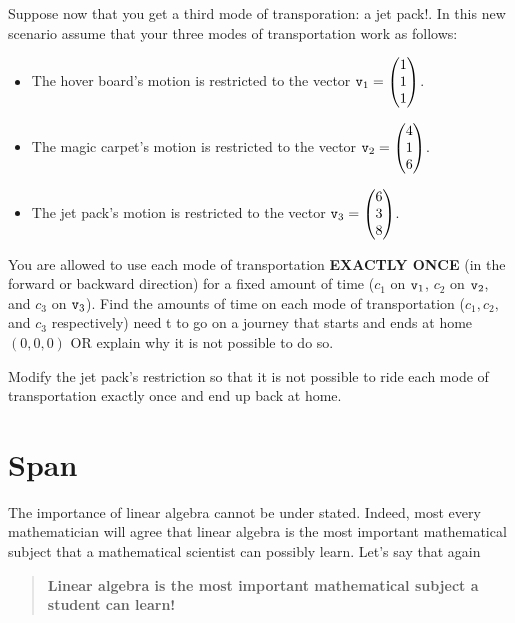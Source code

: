 \begin{problem}
    Suppose now that you get a third mode of transporation: a jet pack!.  In this new
    scenario assume that your three modes of transportation work as follows:
    \begin{itemize}
        \item The hover board's motion is restricted to the vector $\texttt{v}_1 =
            \begin{pmatrix} 1\\1\\1\end{pmatrix}$.
        \item The magic carpet's motion is restricted to the vector $\texttt{v}_2 =
            \begin{pmatrix} 4\\1\\6\end{pmatrix}$.
        \item The jet pack's motion is restricted to the vector $\texttt{v}_3 =
            \begin{pmatrix} 6\\3\\8\end{pmatrix}$.
    \end{itemize}
    You are allowed to use each mode of transportation {\bf EXACTLY ONCE} (in the forward or
    backward direction) for a fixed amount of time ($c_1$ on $\texttt{v}_1$, $c_2$ on $\texttt{v}_2$,
    and $c_3$ on $\texttt{v}_3$).  Find the amounts of time on each mode of transportation ($c_1,
    c_2,$ and $c_3$ respectively) need t to go on a journey that starts and ends at home
    $(0,0,0)$ OR explain why it is not possible to do so.
\end{problem}

\begin{problem}
    Modify the jet pack's restriction so that it is not possible to ride each mode of
    transportation exactly once and end up back at home.
\end{problem}



\newpage\section{Span}
The importance of linear algebra cannot be under stated.  Indeed, most every mathematician will
agree that linear algebra is the most important mathematical subject that a mathematical
scientist can possibly learn.  Let's say that again
\begin{quote}
    {\bf Linear algebra is the most important mathematical subject a student can learn!}
\end{quote}

